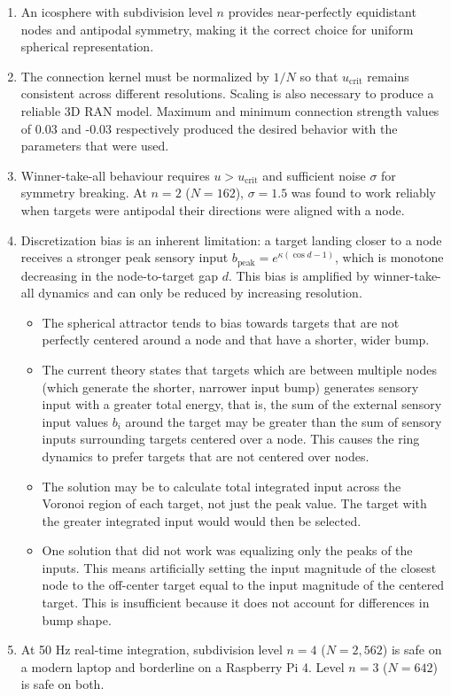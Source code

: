 \documentclass[12pt, letterpaper]{article}
\begin{document}
\begin{enumerate}
    \item An icosphere with subdivision level $n$ provides near-perfectly equidistant nodes and antipodal symmetry, making it the correct choice for uniform spherical representation.

    \item The connection kernel must be normalized by $1/N$ so that $u_{\text{crit}}$ remains consistent across different resolutions. Scaling is also necessary to produce a reliable 3D RAN model. Maximum and minimum connection strength values of 0.03 and -0.03 respectively produced the desired behavior with the parameters that were used.

    \item Winner-take-all behaviour requires $u > u_{\text{crit}}$ and sufficient noise $\sigma$ for symmetry breaking. At $n=2$ ($N=162$), $\sigma = 1.5$ was found to work reliably when targets were antipodal their directions were aligned with a node.

    \item Discretization bias is an inherent limitation: a target landing closer to a node receives a stronger peak sensory input $b_{\text{peak}} = e^{\kappa(\cos d - 1)}$, which is monotone decreasing in the node-to-target gap $d$. This bias is amplified by winner-take-all dynamics and can only be reduced by increasing resolution.
    \begin{itemize}
        \item The spherical attractor tends to bias towards targets that are not perfectly centered around a node and that have a shorter, wider bump.
        \item The current theory states that targets which are between multiple nodes (which generate the shorter, narrower input bump) generates sensory input with a greater total energy, that is, the sum of the external sensory input values $b_i$ around the target may be greater than the sum of sensory inputs surrounding targets centered over a node. This causes the ring dynamics to prefer targets that are not centered over nodes.
        \item The solution may be to calculate total integrated input across the Voronoi region of each target, not just the peak value. The target with the greater integrated input would would then be selected. 
        \item One solution that did not work was equalizing only the peaks of the inputs. This means artificially setting the input magnitude of the closest node to the off-center target equal to the input magnitude of the centered target. This is insufficient because it does not account for differences in bump shape.
    \end{itemize}

    \item At 50 Hz real-time integration, subdivision level $n=4$ ($N=2{,}562$) is safe on a modern laptop and borderline on a Raspberry Pi 4. Level $n=3$ ($N=642$) is safe on both.
\end{enumerate}
\end{document}
